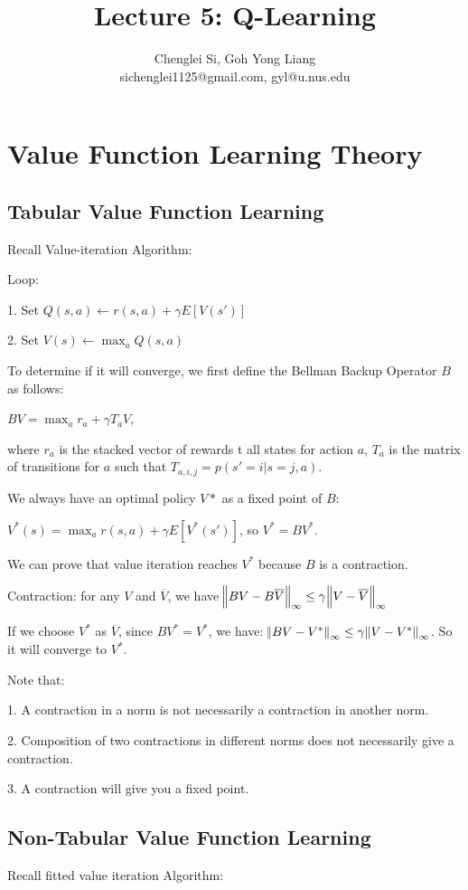 \documentclass{article}
\title{Lecture 5: Q-Learning}
\author{
  Chenglei Si, Goh Yong Liang \\
  sichenglei1125@gmail.com, gyl@u.nus.edu \\
}
\begin{document}
\maketitle


\section{Value Function Learning Theory}
\subsection{Tabular Value Function Learning}
Recall Value-iteration Algorithm:

Loop:

1. Set $Q(s, a) \leftarrow r(s, a) + \gamma E[V(s')]$

2. Set $V(s) \leftarrow \max_{a} Q(s, a)$

To determine if it will converge, we first define the Bellman Backup Operator $B$ as follows:

$BV = \max_a r_a + \gamma T_a V$,

where $r_a$ is the stacked vector of rewards t all states for action $a$, $T_a$ is the matrix of transitions for $a$ such that $T_{a,i,j}=p(s'=i|s=j,a)$.

We always have an optimal policy $V*$ as a fixed point of $B$: 

$V^*(s) = \max_a r(s, a) + \gamma E[V^*(s')]$, so $V^*=BV^*$.

We can prove that value iteration reaches $V^*$ because $B$ is a contraction.

Contraction: for any $V$ and $\overline{V}$, we have $\norm{BV-B\overline{V}}_{\infty} \leq \gamma \norm{V-\overline{V}}_{\infty}$

If we choose $V^*$ as $\overline{V}$, since $BV^*=V^*$, we have: $\norm{BV-V^*}_{\infty} \leq \gamma \norm{V-V^*}_{\infty}$. So it will converge to $V^*$.

Note that:

1. A contraction in a norm is not necessarily a contraction in another norm. 

2. Composition of two contractions in different norms does not necessarily give a contraction.

3. A contraction will give you a fixed point.

\subsection{Non-Tabular Value Function Learning}
Recall fitted value iteration Algorithm:
\end{document}
